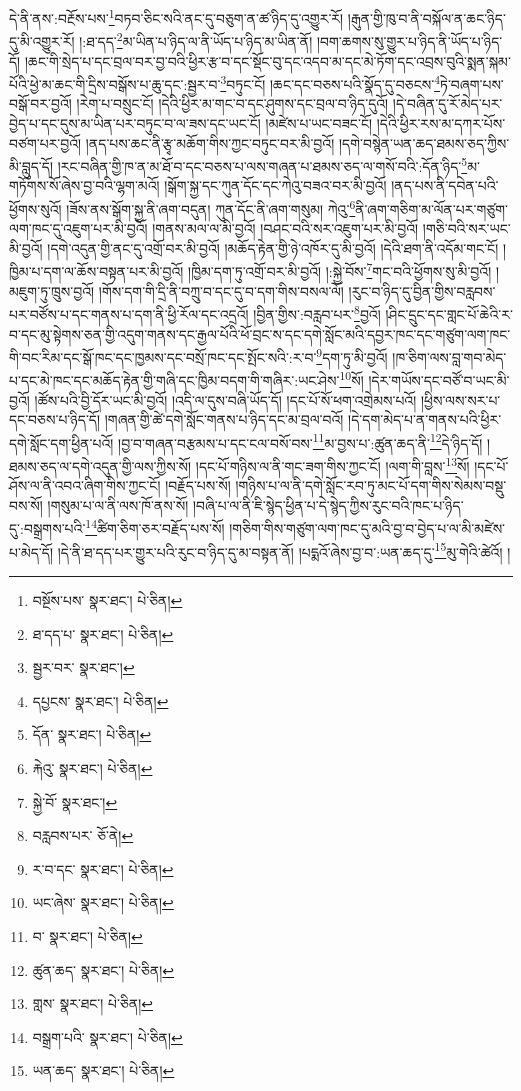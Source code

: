 དེ་ནི་ནས་:བརྔོས་པས་\footnote{བསྔོས་པས་  སྣར་ཐང་།  པེ་ཅིན། }བཏབ་ཅིང་སའི་ནང་དུ་བཅུག་ན་ཚ་ཉིད་དུ་འགྱུར་རོ། །རྒུན་གྱི་ཁུ་བ་ནི་བསྐོལ་ན་ཆང་ཉིད་དུ་མི་འགྱུར་རོ། །:ཐ་དད་\footnote{ཐ་དད་པ་  སྣར་ཐང་།  པེ་ཅིན། }མ་ཡིན་པ་ཉིད་ལ་ནི་ཡོད་པ་ཉིད་མ་ཡིན་ནོ། །བག་ཆགས་སུ་གྱུར་པ་ཉིད་ནི་ཡོད་པ་ཉིད་དོ། །ཆང་གི་སྲེད་པ་དང་བྲལ་བར་བྱ་བའི་ཕྱིར་རྩ་བ་དང་སྡོང་བུ་དང་འདབ་མ་དང་མེ་ཏོག་དང་འབྲས་བུའི་སྨན་སྐམ་པོའི་ཕྱེ་མ་ཆང་གི་དྲིས་བསྒོས་པ་ཆུ་དང་:སྦྱར་བ་\footnote{སྦྱར་བར་  སྣར་ཐང་། }བཏུང་ངོ། །ཆང་དང་བཅས་པའི་སྣོད་དུ་བཅངས་\footnote{དཔྱངས་  སྣར་ཐང་།  པེ་ཅིན། }ཏེ་བཞག་པས་བསྒོ་བར་བྱའོ། །རེག་པ་བསྲུང་ངོ། །དེའི་ཕྱིར་མ་གང་བ་དང་ཤུགས་དང་བྲལ་བ་ཉིད་དུའོ། །དེ་བཞིན་དུ་རོ་མེད་པར་བྱེད་པ་དང་དུས་མ་ཡིན་པར་བཏུང་བ་ལ་ཟས་དང་ཡང་ངོ། །མཛེས་པ་ཡང་བཟང་ངོ། །དེའི་ཕྱིར་རས་མ་དཀར་པོས་བཙག་པར་བྱའོ། །ནད་པས་ཆང་ནི་རྩྭ་མཆོག་གིས་ཀྱང་བཏུང་བར་མི་བྱའོ། །དགེ་བསྙེན་ཡན་ཆད་ཐམས་ཅད་ཀྱིས་མི་བླུད་དོ། །རང་བཞིན་གྱི་ཁ་ན་མ་ཐོ་བ་དང་བཅས་པ་ལས་གཞན་པ་ཐམས་ཅད་ལ་གསོ་བའི་:དོན་ཉིད་\footnote{དོན་  སྣར་ཐང་།  པེ་ཅིན། }མ་གཏོགས་སོ་ཞེས་བྱ་བའི་ལྷག་མའོ། །སྒོག་སྐྱ་དང་ཀུན་དོང་དང་ཀེའུ་བཟའ་བར་མི་བྱའོ། །ནད་པས་ནི་དབེན་པའི་ཕྱོགས་སུའོ། །ཟོས་ནས་སྒོག་སྐྱ་ནི་ཞག་བདུན། ཀུན་དོང་ནི་ཞག་གསུམ། ཀེའུ་\footnote{རྐེའུ་  སྣར་ཐང་།  པེ་ཅིན། }ནི་ཞག་གཅིག་མ་ལོན་པར་གཙུག་ལག་ཁང་དུ་འཇུག་པར་མི་བྱའོ། །གནས་མལ་ལ་མི་བྱའོ། །བཤང་བའི་སར་འཇུག་པར་མི་བྱའོ། །གཅི་བའི་སར་ཡང་མི་བྱའོ། །དགེ་འདུན་གྱི་ནང་དུ་འགྲོ་བར་མི་བྱའོ། །མཆོད་རྟེན་གྱི་ཉེ་འཁོར་དུ་མི་བྱའོ། །དེའི་ཐག་ནི་འདོམ་གང་ངོ། །ཁྱིམ་པ་དག་ལ་ཆོས་བསྟན་པར་མི་བྱའོ། །ཁྱིམ་དག་ཏུ་འགྲོ་བར་མི་བྱའོ། །:སྐྱེ་བོས་\footnote{སྐྱེ་བོ་  སྣར་ཐང་། }གང་བའི་ཕྱོགས་སུ་མི་བྱའོ། །མཇུག་ཏུ་ཁྲུས་བྱའོ། །གོས་དག་གི་དྲི་ནི་བཀྲུ་བ་དང་དུ་བ་དག་གིས་བསལ་ལོ། །རུང་བ་ཉིད་དུ་བྱིན་གྱིས་བརླབས་པར་བཙོས་པ་དང་གནས་པ་དག་ནི་ཕྱི་རོལ་དང་འདྲའོ། །བྱིན་གྱིས་:བརླབ་པར་\footnote{བརླབས་པར་  ཅོ་ནེ། }བྱའོ། །ཤིང་དྲུང་དང་གླང་པོ་ཆེའི་ར་བ་དང་མུ་སྟེགས་ཅན་གྱི་འདུག་གནས་དང་རྒྱལ་པོའི་ཕོ་བྲང་ས་དང་དགེ་སློང་མའི་དབྱར་ཁང་དང་གཙུག་ལག་ཁང་གི་བང་རིམ་དང་སྒོ་ཁང་དང་ཁྱམས་དང་བསྲོ་ཁང་དང་སྤོང་སའི་:ར་བ་\footnote{ར་བ་དང་  སྣར་ཐང་།  པེ་ཅིན། }དག་ཏུ་མི་བྱའོ། །ཁ་ཅིག་ལས་བླ་གབ་མེད་པ་དང་མེ་ཁང་དང་མཆོད་རྟེན་གྱི་གཞི་དང་ཁྱིམ་བདག་གི་གཞིར་:ཡང་ཤེས་\footnote{ཡང་ཞེས་  སྣར་ཐང་།  པེ་ཅིན། }སོ། །དེར་གཡོས་དང་བཙོ་བ་ཡང་མི་བྱའོ། །ཚོས་པའི་བྱི་དོར་ཡང་མི་བྱའོ། །འདི་ལ་དུས་བཞི་ཡོད་དོ། །དང་པོ་སོ་ཕག་འགྲེམས་པའོ། །ཕྱིས་ལས་སར་པ་དང་བཅས་པ་ཉིད་དོ། །གཞན་གྱི་ཚེ་དགེ་སློང་གནས་པ་ཉིད་དང་མ་བྲལ་བའོ། །དེ་དག་མེད་པ་ན་གནས་པའི་ཕྱིར་དགེ་སློང་དག་ཕྱིན་པའོ། །བྱ་བ་གཞན་བརྩམས་པ་དང་ངལ་བསོ་བས་\footnote{བ་  སྣར་ཐང་།  པེ་ཅིན། }མ་བྱས་པ་:ཚུན་ཆད་ནི་\footnote{ཚུན་ཆད་  སྣར་ཐང་།  པེ་ཅིན། }དེ་ཉིད་དོ། །ཐམས་ཅད་ལ་དགེ་འདུན་གྱི་ལས་ཀྱིས་སོ། །དང་པོ་གཉིས་ལ་ནི་གང་ཟག་གིས་ཀྱང་ངོ། །ལག་གི་བླས་\footnote{གླས་  སྣར་ཐང་།  པེ་ཅིན། }སོ། །དང་པོ་ཤོས་ལ་ནི་འབའ་ཞིག་གིས་ཀྱང་ངོ། །བརྗོད་པས་སོ། །གཉིས་པ་ལ་ནི་དགེ་སློང་རབ་ཏུ་མང་པོ་དག་གིས་སེམས་བསྡུ་བས་སོ། །གསུམ་པ་ལ་ནི་ལས་ཁོ་ནས་སོ། །བཞི་པ་ལ་ནི་ཇི་སྙེད་ཕྱིན་པ་དེ་སྙེད་ཀྱིས་རུང་བའི་ཁང་པ་ཉིད་དུ་:བསྒྲགས་པའི་\footnote{བསྒྲག་པའི་  སྣར་ཐང་།  པེ་ཅིན། }ཚིག་ཅིག་ཅར་བརྗོད་པས་སོ། །གཅིག་གིས་གཙུག་ལག་ཁང་དུ་མའི་བྱ་བ་བྱེད་པ་ལ་མི་མཛེས་པ་མེད་དོ། །དེ་ནི་ཐ་དད་པར་གྱུར་པའི་རུང་བ་ཉིད་དུ་མ་བསྟན་ནོ། །པདྨའོ་ཞེས་བྱ་བ་:ཡན་ཆད་དུ་\footnote{ཡན་ཆད་  སྣར་ཐང་།  པེ་ཅིན། }མུ་གེའི་ཚེའོ། །
